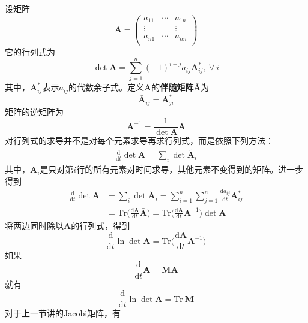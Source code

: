 \documentclass[12pt]{article}
\begin{document}
设矩阵
\begin{equation*}
    \bm{A} = 
    \begin{pmatrix}
        a_{11} & \cdots & a_{1n}\\
        \vdots & & \vdots\\
        a_{n1} & \cdots & a_{nn}\\
        \end{pmatrix}
\end{equation*}
它的行列式为
\begin{equation*}
    \det{\bm{A}} = \sum_{j=1}^n (-1)^{i+j} a_{ij} \bm{A}_{ij}^*, \ \forall \ i
\end{equation*}
其中，$\bm{A}_{ij}^*$表示$a_{ij}$的代数余子式。定义$\bm{A}$的\textbf{伴随矩阵}$\bar{\bm{A}}$为
\begin{equation*}
    \bar{\bm{A}}_{ij} = \bm{A}_{ji}^* 
\end{equation*}
矩阵的逆矩阵为
\begin{equation*}
    \bm{A}^{-1} = \frac 1{\det{\bm{A}}} \bm{\bar{A}}
\end{equation*}
对行列式的求导并不是对每个元素求导再求行列式，而是依照下列方法：
\begin{align*}
    \frac {\mathrm{d}}{\mathrm{d}t} \det{\bm{A}} = \sum_i \det{\tilde{\bm{A}_i}}
\end{align*}
其中，$\bm{A}_i$是只对第$i$行的所有元素对时间求导，其他元素不变得到的矩阵。进一步得到
\begin{align*}
    \frac {\mathrm{d}}{\mathrm{d}t} \det{\bm{A}} &= \sum_i \det{\tilde{\bm{A}_i}} = \sum_{i=1}^n \sum_{j=1}^n \frac {\mathrm{d}a_{ij}}{\mathrm{d}t} \bm{A}_{ij}^*\\
    &= \mathrm{Tr} \bigg(\frac {\mathrm{d}\bm{A}}{\mathrm{d}t} \bar{\bm{A}}\bigg) = \mathrm{Tr} \bigg(\frac {\mathrm{d}\bm{A}}{\mathrm{d}t} \bm{A}^{-1}\bigg) \det{\bm{A}}
\end{align*}
将两边同时除以$\bm{A}$的行列式，得到
\begin{equation*}
    \frac {\mathrm{d}}{\mathrm{d}t} \ln{\det{\bm{A}}} = \mathrm{Tr} \bigg(\frac {\mathrm{d}\bm{A}}{\mathrm{d}t} \bm{A}^{-1}\bigg)
\end{equation*}
如果
\begin{equation*}
    \frac {\mathrm{d}}{\mathrm{d}t} \bm{A} = \bm{MA}
\end{equation*}
就有
\begin{equation*}
    \frac {\mathrm{d}}{\mathrm{d}t} \ln{\det{\bm{A}}} = \mathrm{Tr}\ \bm{M}
\end{equation*}
对于上一节讲的Jacobi矩阵，有
\end{document}
